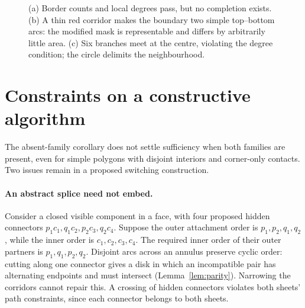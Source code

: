 \documentclass[11pt,a4paper]{article}
\theoremstyle{definition}
\begin{document}
\begin{figure}[htbp]
\centering
{}
\caption{(a) Border counts and local degrees pass, but no completion exists.
(b) A thin red corridor makes the boundary two simple top--bottom arcs:
the modified mask is representable and differs by arbitrarily little area.
(c) Six branches meet at the centre, violating the degree condition;
the circle delimits the neighbourhood.}
\label{fig:obstructions}
\end{figure}

\section{Constraints on a constructive algorithm}
The absent-family corollary does not settle sufficiency when both families
are present, even for simple polygons with disjoint interiors and corner-only
contacts. Two issues remain in a proposed switching construction.

\paragraph{An abstract splice need not embed.}
Consider a closed visible component in a face, with four proposed hidden
connectors $p_1c_1,q_1c_2,p_2c_3,q_2c_4$. Suppose the outer attachment order
is $p_1,p_2,q_1,q_2$, while the inner order is $c_1,c_2,c_3,c_4$.
The required inner order of their outer partners is $p_1,q_1,p_2,q_2$.
Disjoint arcs across an annulus preserve cyclic order: cutting along one
connector gives a disk in which an incompatible pair has alternating
endpoints and must intersect (Lemma~\ref{lem:parity}). Narrowing the corridors
cannot repair this. A crossing of hidden connectors violates both sheets'
path constraints, since each connector belongs to both sheets.
\end{document}
